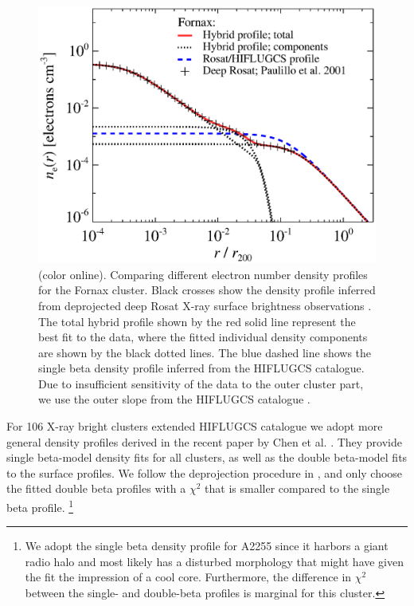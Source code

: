 \documentclass[10pt,aps,pra,reprint,amsmath,amsfonts,amssymb,showpacs,nofootinbib,floatfix]{revtex4-1}
\newcommand{\colo}{(color online). }
\begin{document}
{\begin{figure}%
 \includegraphics[width=0.99\columnwidth]{figures/dens.fornax.bw.eps}
 \caption{\colo Comparing different electron number
   density profiles for the Fornax cluster. Black crosses show the
   density profile inferred from deprojected deep Rosat X-ray surface
   brightness observations \protect \cite{2002ApJ...565..883P}. The
   total hybrid profile shown by the red solid line represent the best
   fit to the data, where the fitted individual density components are
   shown by the black dotted lines. The blue dashed line shows the
   single beta density profile inferred from the HIFLUGCS
   catalogue. Due to insufficient sensitivity of the data to the outer
   cluster part, we use the outer slope from the HIFLUGCS catalogue
   \cite{2007A&A...466..805C}.}
 \label{fig:dens_fornax}
\end{figure}

For 106 X-ray bright clusters extended HIFLUGCS catalogue we adopt
more general density profiles derived in the recent paper by Chen et
al. \cite{2007A&A...466..805C}. They provide single beta-model density
fits for all clusters, as well as the double beta-model fits to the
surface profiles. We follow the deprojection procedure in
\cite{2004A&A...413...17P}, and only choose the fitted double beta
profiles with a $\chi^2$ that is smaller compared to the single beta
profile. \footnote{We adopt the single beta density profile for A2255
  since it harbors a giant radio halo and most likely has a disturbed
  morphology that might have given the fit the impression of a cool
  core. Furthermore, the difference in $\chi^2$ between the single-
  and double-beta profiles is marginal for this cluster.}


}
\end{document}
